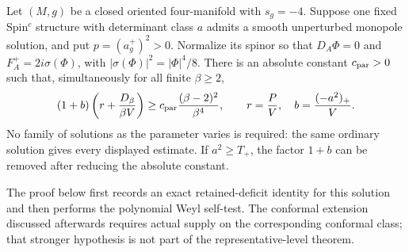 \begin{theorem}
\label{thm:single-parameter}
Let $(M,g)$ be a closed oriented four-manifold with $s_g=-4$. Suppose
one fixed Spin$^c$ structure with determinant class $a$ admits a smooth
unperturbed monopole solution, and put $p=(a_g^+)^2>0$. Normalize its
spinor so that $D_A\Phi=0$ and $F_A^+=2i\sigma(\Phi)$, with
$|\sigma(\Phi)|^2=|\Phi|^4/8$. There is an absolute constant
$c_{\rm par}>0$ such that, simultaneously for all finite $\beta\ge2$,
\[
 (1+b)\left(r+\frac{D_\beta}{\beta V}\right)
 \ge c_{\rm par}\frac{(\beta-2)^2}{\beta^4},\qquad
 r=\frac{P}{V},\quad b=\frac{(-a^2)_+}{V}.
\]
No family of solutions as the parameter varies is required: the same
ordinary solution gives every displayed estimate. If $a^2\ge T_+$,
the factor $1+b$ can be removed after reducing the absolute constant.
\end{theorem}
The proof below first records an exact retained-deficit identity for
this solution and then performs the polynomial Weyl self-test. The
conformal extension discussed afterwards requires actual supply on
the corresponding conformal class; that stronger hypothesis is not
part of the representative-level theorem.
